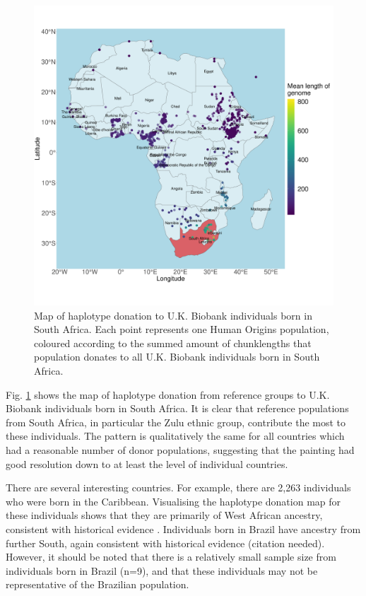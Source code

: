 \begin{figure}[htp]
    \centering
    \includegraphics[width=1.0\textwidth]{../images/chapter3/haplotype_map_SouthAfrica.pdf}
    \caption{Map of haplotype donation to U.K. Biobank individuals born in South Africa. Each point represents one Human Origins population, coloured according to the summed amount of chunklengths that population donates to all U.K. Biobank individuals born in South Africa. }
    \label{fig:haplotype_map_SouthAfrica}
\end{figure}

Fig. \ref{fig:haplotype_map_SouthAfrica} shows the map of haplotype donation from reference groups to U.K. Biobank individuals born in South Africa. It is clear that reference populations from South Africa, in particular the Zulu ethnic group, contribute the most to these individuals. The pattern is qualitatively the same for all countries which had a reasonable number of donor populations, suggesting that the painting had good resolution down to at least the level of individual countries.

There are several interesting countries. For example, there are 2,263 individuals who were born in the Caribbean. Visualising the haplotype donation map for these individuals shows that they are primarily of West African ancestry, consistent with historical evidence \cite{micheletti2020genetic}. Individuals born in Brazil have ancestry from further South, again consistent with historical evidence (citation needed). However, it should be noted that there is a relatively small sample size from individuals born in Brazil (n=9), and that these individuals may not be representative of the Brazilian population. 

